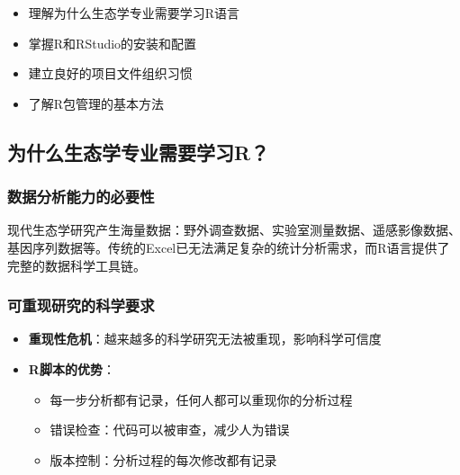 \documentclass[
]{book}
\providecommand{\tightlist}{%
  \setlength{\itemsep}{0pt}\setlength{\parskip}{0pt}}
\begin{document}
\begin{itemize}
\tightlist
\item
  理解为什么生态学专业需要学习R语言
\item
  掌握R和RStudio的安装和配置
\item
  建立良好的项目文件组织习惯
\item
  了解R包管理的基本方法
\end{itemize}

\hypertarget{ux4e3aux4ec0ux4e48ux751fux6001ux5b66ux4e13ux4e1aux9700ux8981ux5b66ux4e60r}{%
\subsection{为什么生态学专业需要学习R？}\label{ux4e3aux4ec0ux4e48ux751fux6001ux5b66ux4e13ux4e1aux9700ux8981ux5b66ux4e60r}}

\hypertarget{ux6570ux636eux5206ux6790ux80fdux529bux7684ux5fc5ux8981ux6027}{%
\subsubsection{数据分析能力的必要性}\label{ux6570ux636eux5206ux6790ux80fdux529bux7684ux5fc5ux8981ux6027}}

现代生态学研究产生海量数据：野外调查数据、实验室测量数据、遥感影像数据、基因序列数据等。传统的Excel已无法满足复杂的统计分析需求，而R语言提供了完整的数据科学工具链。

\hypertarget{ux53efux91cdux73b0ux7814ux7a76ux7684ux79d1ux5b66ux8981ux6c42}{%
\subsubsection{可重现研究的科学要求}\label{ux53efux91cdux73b0ux7814ux7a76ux7684ux79d1ux5b66ux8981ux6c42}}

\begin{itemize}
\tightlist
\item
  \textbf{重现性危机}：越来越多的科学研究无法被重现，影响科学可信度
\item
  \textbf{R脚本的优势}：

  \begin{itemize}
  \tightlist
  \item
    每一步分析都有记录，任何人都可以重现你的分析过程
  \item
    错误检查：代码可以被审查，减少人为错误
  \item
    版本控制：分析过程的每次修改都有记录
  \end{itemize}
\end{itemize}
\end{document}
